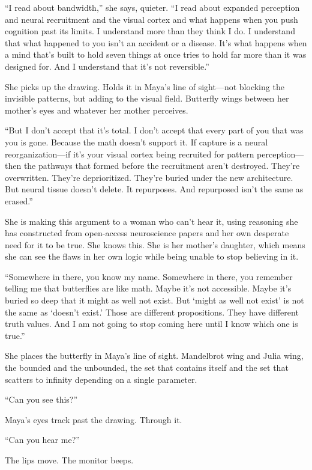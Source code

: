 ``I read about bandwidth,'' she says, quieter. ``I read about expanded perception and neural recruitment and the visual cortex and what happens when you push cognition past its limits. I understand more than they think I do. I understand that what happened to you isn't an accident or a disease. It's what happens when a mind that's built to hold seven things at once tries to hold far more than it was designed for. And I understand that it's not reversible.''

She picks up the drawing. Holds it in Maya's line of sight---not blocking the invisible patterns, but adding to the visual field. Butterfly wings between her mother's eyes and whatever her mother perceives.

``But I don't accept that it's total. I don't accept that every part of you that was you is gone. Because the math doesn't support it. If capture is a neural reorganization---if it's your visual cortex being recruited for pattern perception---then the pathways that formed before the recruitment aren't destroyed. They're overwritten. They're deprioritized. They're buried under the new architecture. But neural tissue doesn't delete. It repurposes. And repurposed isn't the same as erased.''

She is making this argument to a woman who can't hear it, using reasoning she has constructed from open-access neuroscience papers and her own desperate need for it to be true. She knows this. She is her mother's daughter, which means she can see the flaws in her own logic while being unable to stop believing in it.

``Somewhere in there, you know my name. Somewhere in there, you remember telling me that butterflies are like math. Maybe it's not accessible. Maybe it's buried so deep that it might as well not exist. But `might as well not exist' is not the same as `doesn't exist.' Those are different propositions. They have different truth values. And I am not going to stop coming here until I know which one is true.''

She places the butterfly in Maya's line of sight. Mandelbrot wing and Julia wing, the bounded and the unbounded, the set that contains itself and the set that scatters to infinity depending on a single parameter.

``Can you see this?''

Maya's eyes track past the drawing. Through it.

``Can you hear me?''

The lips move. The monitor beeps.

